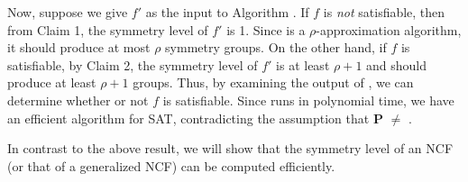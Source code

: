\medskip
 
Now, suppose we give $f'$ as the input to Algorithm \cala.
If $f$ is \emph{not} satisfiable, then from Claim 1, 
the symmetry level of $f'$ is 1. 
Since \cala{} is a $\rho$-approximation algorithm,
it should produce at most $\rho$ symmetry groups.
On the other hand, if $f$ is satisfiable, by Claim 2, the symmetry
level of $f'$ is at least $\rho+1$ and \cala{} should produce at least
$\rho+1$ groups.
Thus, by examining the output of \cala, we can determine whether or not $f$
is satisfiable.
Since \cala{} runs in polynomial time, we have an efficient 
algorithm for SAT, contradicting the assumption that \textbf{P} $\neq$ \cnp.
\QED

\medskip

In contrast to the above result,
we will show that the symmetry level of an NCF (or that of a
generalized NCF) can be computed efficiently.

